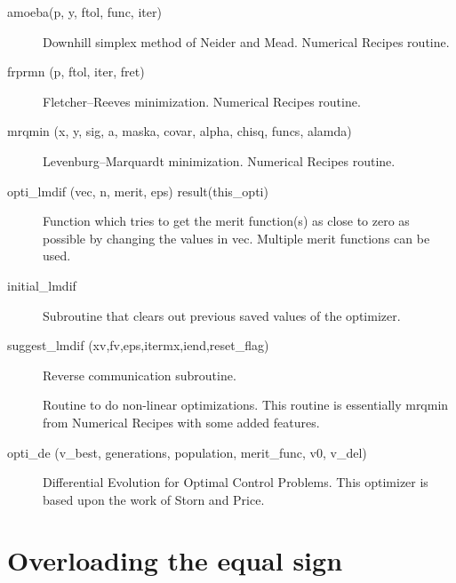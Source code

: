 \begin{description}


\item[amoeba(p, y, ftol, func, iter)] \Newline
Downhill simplex method of Neider and Mead. Numerical Recipes routine.

\item[frprmn (p, ftol, iter, fret)] \Newline
Fletcher--Reeves minimization. Numerical Recipes routine.

\item[mrqmin (x, y, sig, a, maska, covar, alpha, chisq, funcs, alamda)] \Newline
Levenburg--Marquardt minimization. Numerical Recipes routine.

\item[opti_lmdif (vec, n, merit, eps) result(this_opti)] \Newline 
Function which tries to get the merit function(s) as close to zero as possible
by changing the values in vec. Multiple merit functions can be used.

\item[initial_lmdif] \Newline 
Subroutine that clears out previous saved values of the optimizer.

\item[suggest_lmdif (xv,fv,eps,itermx,iend,reset_flag)] \Newline 
Reverse communication subroutine. 

\item[\protect\parbox{6in}{super_mrqmin (y, weight, a, covar, alpha, chisq, funcs, \\
  \hspace*{2in} alamda, status, maska)}] \Newline 
Routine to do non-linear optimizations. 
This routine is essentially mrqmin from Numerical Recipes with some added features.

\item[opti_de (v_best, generations, population, merit_func, v0, v_del)] \Newline 
Differential Evolution for Optimal Control Problems.
This optimizer is based upon the work of Storn and Price. 

\end{description}

\section{Overloading the equal sign}
\label{r:equal}    

